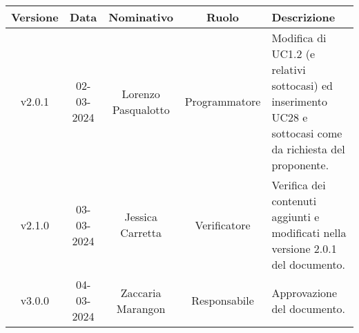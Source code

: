     \begin{table}[H]
        \centering
        \renewcommand\tabularxcolumn[1]{m{#1}} %
        \renewcommand{\arraystretch}{1.5}
        \begin{tabularx}{0.98\textwidth}
            {c|c|c|c|>{\centering\arraybackslash}X}
            \rowcolor{black}
            \textbf{\color{white} Versione} & \textbf{\color{white} Data} & \textbf{\color{white} Nominativo} & \textbf{\color{white} Ruolo} & \textbf{\color{white} Descrizione} \\ 
            \hline
            v2.0.1 & 02-03-2024 & Lorenzo Pasqualotto & Programmatore & Modifica di UC1.2 (e relativi sottocasi) ed inserimento UC28 e sottocasi come da richiesta del proponente.\\
            v2.1.0 & 03-03-2024 & Jessica Carretta & Verificatore & Verifica dei contenuti aggiunti e modificati nella versione 2.0.1 del documento.\\
            v3.0.0 & 04-03-2024 & Zaccaria Marangon & Responsabile & Approvazione del documento.\\
            \hline
        \end{tabularx}
    \end{table}